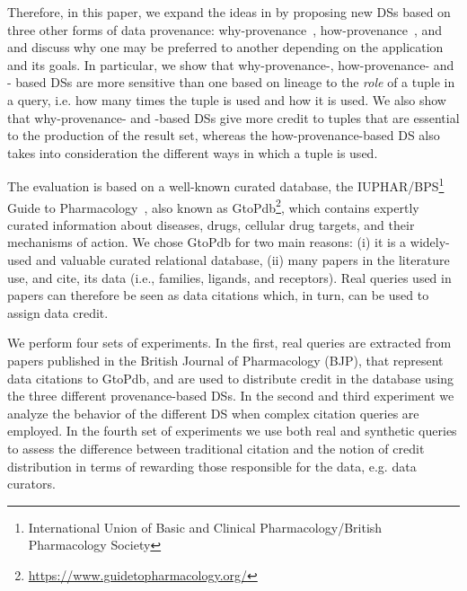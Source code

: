 Therefore, in this paper, we expand the ideas in \citep{dosso2020data} by proposing new DSs based on three other forms of data provenance: why-provenance~\citep{WhyProvBuneman}, how-provenance~\citep{howProvenanceGreen}, and 
 and discuss why one may be preferred to another depending on the application and its goals. 
In particular, we show that why-provenance-,  how-provenance- and - based DSs are more sensitive than one based on lineage to the {\em role} of a tuple in a query, i.e. how many times the tuple is used and how it is used. We also show that
why-provenance- and -based DSs give more credit to tuples that are essential to the production of the result set, whereas the how-provenance-based DS also takes into consideration the different ways in which a tuple is used. 

The evaluation is based on a well-known curated database, the IUPHAR/BPS\footnote{International Union of Basic and Clinical Pharmacology/British Pharmacology Society} Guide to Pharmacology~\citep{iuphar2018}, also known as GtoPdb\footnote{\url{https://www.guidetopharmacology.org/}}, which contains expertly curated information about diseases, drugs, cellular drug targets, and their mechanisms of action.
We chose GtoPdb for two main reasons: (i) it is a widely-used and valuable curated relational database, (ii) many papers in the literature use, and cite, its data (i.e., families, ligands, and receptors). 
Real queries used in papers can therefore be seen as data citations which, in turn, can be used to assign data credit.

We perform four sets of experiments. In the first, real queries are extracted from papers published in the British Journal of Pharmacology (BJP), that represent data citations to GtoPdb, and are used to distribute credit in the database using the three different provenance-based DSs. 
In the second and third experiment we analyze the behavior of the different DS when complex citation queries are employed.
In the fourth set of experiments we use both real and synthetic queries to assess the difference between traditional citation and the notion of credit distribution in terms of rewarding those responsible for the data, e.g. data curators.

